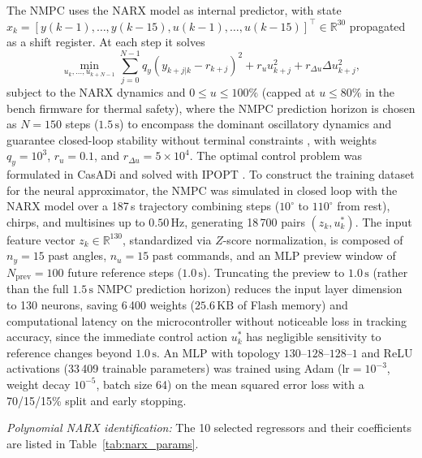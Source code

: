 \documentclass{ifacconf}
\newif\ifinstr \instrfalse
\newcommand{\instr}[1]{%
  \ifinstr
    \par\noindent
    \fcolorbox{orange!80!black}{yellow!20}{%
      \parbox{\dimexpr\linewidth-2\fboxsep-2\fboxrule}{%
        \small\sffamily\color{orange!40!black}%
        \textbf{Instrução:} #1}}%
    \par\medskip
  \fi}
\begin{document}
The NMPC uses the NARX model as internal predictor, with state $x_k = [y(k-1),\dots,y(k-15), \allowbreak u(k-1),\dots,u(k-15)]^\top \in \mathbb{R}^{30}$ propagated as a shift register. At each step it solves
\begin{equation}
    \min_{u_k,\dots,u_{k+N-1}} \sum_{j=0}^{N-1} q_y (y_{k+j|k} - r_{k+j})^2 + r_u u_{k+j}^2 + r_{\Delta u} \Delta u_{k+j}^2,
    \label{eq:ocp}
\end{equation}
subject to the NARX dynamics and $0 \le u \le 100\%$ (capped at $u \le 80\%$ in the bench firmware for thermal safety), where the NMPC prediction horizon is chosen as $N = 150$ steps ($1.5\,\mathrm{s}$) to encompass the dominant oscillatory dynamics and guarantee closed-loop stability without terminal constraints \citep{rawlings2017}, with weights $q_y = 10^3$, $r_u = 0.1$, and $r_{\Delta u} = 5\times 10^4$. The optimal control problem was formulated in CasADi \citep{andersson2019} and solved with IPOPT \citep{wachter2006}. To construct the training dataset for the neural approximator, the NMPC was simulated in closed loop with the NARX model over a 187\,s trajectory combining steps ($10^\circ$ to $110^\circ$ from rest), chirps, and multisines up to $0.50\,\mathrm{Hz}$, generating 18\,700 pairs $(z_k, u_k^*)$. The input feature vector $z_k \in \mathbb{R}^{130}$, standardized via $Z$-score normalization, is composed of $n_y = 15$ past angles, $n_u = 15$ past commands, and an MLP preview window of $N_{\mathrm{prev}} = 100$ future reference steps ($1.0\,\mathrm{s}$). Truncating the preview to $1.0\,\mathrm{s}$ (rather than the full $1.5\,\mathrm{s}$ NMPC prediction horizon) reduces the input layer dimension to 130 neurons, saving 6\,400 weights ($25.6\,\mathrm{KB}$ of Flash memory) and computational latency on the microcontroller without noticeable loss in tracking accuracy, since the immediate control action $u_k^*$ has negligible sensitivity to reference changes beyond $1.0\,\mathrm{s}$. An MLP with topology $130$--$128$--$128$--$1$ and ReLU activations (33\,409 trainable parameters) was trained using Adam ($\text{lr} = 10^{-3}$, weight decay $10^{-5}$, batch size 64) on the mean squared error loss with a 70/15/15\% split and early stopping.

\instr{Descrever todas as condições para criar os modelos (hiperparametros). Definir protocolo de treino e teste (quais datasets sao usados e para que, referenciar secao anterior). Metrica para comparacao (RMSE).}

\textit{Polynomial NARX identification:} The 10 selected regressors and their coefficients are listed in Table~\ref{tab:narx_params}.
\end{document}
